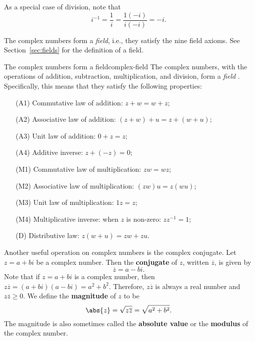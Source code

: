 As a special case of division, note that
\begin{equation*}
  i^{-1} = \frac{1}{i} = \frac{1(-i)}{i(-i)} = -i.
\end{equation*}

The complex numbers form a {\em field}, i.e., they satisfy the nine
field axioms. See Section~\ref{sec:fields} for the definition of a
field.

\begin{proposition}{The complex numbers form a field}{complex-field}
  The complex numbers, with the operations of addition, subtraction,
  multiplication, and division, form a {\em field}%
  . Specifically,
  this means that they satisfy the following properties:
  \begin{itemize}
  \item[(A1)] {Commutative law of addition:} $z+w=w+z$;
  \item[(A2)] {Associative law of addition:} $(z+w)+u = z+(w+u)$;
  \item[(A3)] {Unit law of addition:} $0+z = z$;
  \item[(A4)] {Additive inverse:} $z+(-z)=0$;
  \item[(M1)] {Commutative law of multiplication:} $zw=wz$;
  \item[(M2)] {Associative law of multiplication:} $(zw)u=z(wu)$;
  \item[(M3)] {Unit law of multiplication:} $1z=z$;
  \item[(M4)] {Multiplicative inverse:} when $z$ is non-zero: $zz^{-1}=1$;
  \item[(D)] {Distributive law:} $z(w+u)=zw+zu$.
  \end{itemize}
\end{proposition}

Another useful operation on complex numbers is the complex
conjugate. Let $z = a+bi$ be a complex number. Then the
\textbf{conjugate}%
%
 of $z$, written $\overline{z}$, is given by
\begin{equation*}
  \overline{z} = a-bi.
\end{equation*}
Note that if $z=a+bi$ is a complex number, then
$z\overline{z} = (a+bi)(a-bi) = a^2+b^2$. Therefore, $z\overline{z}$
is always a real number and $z\overline{z}\geq 0$. We define the
\textbf{magnitude}%
 of $z$ to be
\begin{equation*}
  \abs{z} = \sqrt{z\overline{z}} = \sqrt{a^2+b^2}.
\end{equation*}
The magnitude is also sometimes called the \textbf{absolute
  value}%
 or the
\textbf{modulus}%
 of the complex
number.

